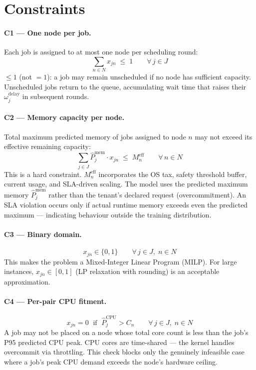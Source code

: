 \documentclass[11pt]{article}
\newcommand{\Meff}{M_n^{\text{eff}}}
\newcommand{\omdelay}{\omega_j^{\text{delay}}}
\newcommand{\Pmem}{\hat{P}_j^{\text{mem}}}
\newcommand{\Pcpu}{\hat{P}_j^{\text{CPU}}}
\begin{document}
\section{Constraints}

\paragraph{C1 --- One node per job.}
Each job is assigned to at most one node per scheduling round:
\[
  \sum_{n \in N} x_{jn} \;\leq\; 1 \qquad \forall\, j \in J
\]
$\leq 1$ (not $= 1$): a job may remain unscheduled if no node has sufficient
capacity. Unscheduled jobs return to the queue, accumulating wait time that
raises their $\omdelay$ in subsequent rounds.

\paragraph{C2 --- Memory capacity per node.}
Total maximum predicted memory of jobs assigned to node $n$ may not exceed its
effective remaining capacity:
\[
  \sum_{j \in J} \Pmem \cdot x_{jn} \;\leq\; \Meff \qquad \forall\, n \in N
\]
This is a hard constraint. $\Meff$ incorporates the OS tax, safety threshold
buffer, current usage, and SLA-driven scaling. The model uses the predicted
maximum memory $\Pmem$ rather than the tenant's declared request
(overcommitment). An SLA violation occurs only if actual runtime memory
exceeds even the predicted maximum --- indicating behaviour outside the
training distribution.

\paragraph{C3 --- Binary domain.}
\[
  x_{jn} \in \{0,1\} \qquad \forall\, j \in J,\; n \in N
\]
This makes the problem a Mixed-Integer Linear Program (MILP). For large
instances, $x_{jn} \in [0,1]$ (LP relaxation with rounding) is an acceptable
approximation.

\paragraph{C4 --- Per-pair CPU fitment.}
\[
  x_{jn} = 0 \;\text{ if }\; \Pcpu > C_n
  \qquad \forall\, j \in J,\; n \in N
\]
A job may not be placed on a node whose total core count is less than the
job's P95 predicted CPU peak. CPU cores are time-shared --- the kernel handles
overcommit via throttling. This check blocks only the genuinely infeasible
case where a job's peak CPU demand exceeds the node's hardware ceiling.
\end{document}
